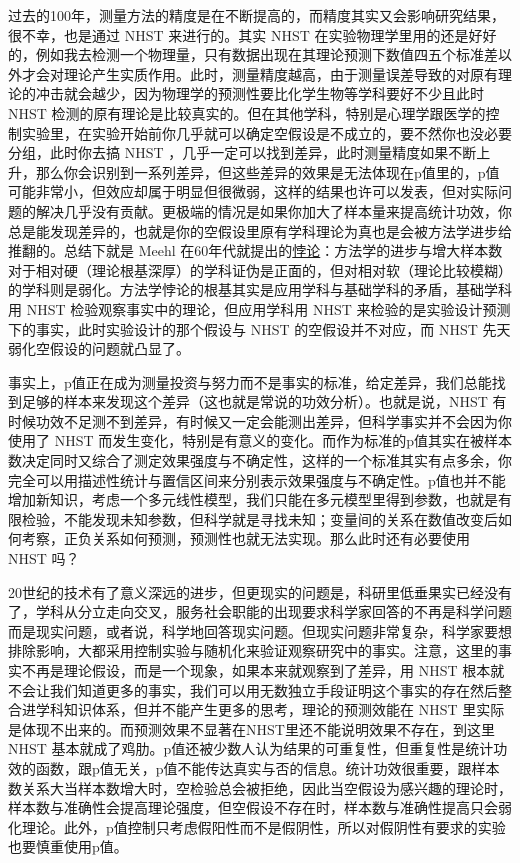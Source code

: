 \documentclass[]{tufte-book}
\begin{document}
过去的100年，测量方法的精度是在不断提高的，而精度其实又会影响研究结果，很不幸，也是通过 NHST 来进行的。其实 NHST 在实验物理学里用的还是好好的，例如我去检测一个物理量，只有数据出现在其理论预测下数值四五个标准差以外才会对理论产生实质作用。此时，测量精度越高，由于测量误差导致的对原有理论的冲击就会越少，因为物理学的预测性要比化学生物等学科要好不少且此时 NHST 检测的原有理论是比较真实的。但在其他学科，特别是心理学跟医学的控制实验里，在实验开始前你几乎就可以确定空假设是不成立的，要不然你也没必要分组，此时你去搞 NHST ，几乎一定可以找到差异，此时测量精度如果不断上升，那么你会识别到一系列差异，但这些差异的效果是无法体现在p值里的，p值可能非常小，但效应却属于明显但很微弱，这样的结果也许可以发表，但对实际问题的解决几乎没有贡献。更极端的情况是如果你加大了样本量来提高统计功效，你总是能发现差异的，也就是你的空假设里原有学科理论为真也是会被方法学进步给推翻的。总结下就是 Meehl 在60年代就提出的\href{https://philpapers.org/rec/MEETIP}{悖论}：方法学的进步与增大样本数对于相对硬（理论根基深厚）的学科证伪是正面的，但对相对软（理论比较模糊）的学科则是弱化。方法学悖论的根基其实是应用学科与基础学科的矛盾，基础学科用 NHST 检验观察事实中的理论，但应用学科用 NHST 来检验的是实验设计预测下的事实，此时实验设计的那个假设与 NHST 的空假设并不对应，而 NHST 先天弱化空假设的问题就凸显了。

事实上，p值正在成为测量投资与努力而不是事实的标准，给定差异，我们总能找到足够的样本来发现这个差异（这也就是常说的功效分析）。也就是说，NHST 有时候功效不足测不到差异，有时候又一定会能测出差异，但科学事实并不会因为你使用了 NHST 而发生变化，特别是有意义的变化。而作为标准的p值其实在被样本数决定同时又综合了测定效果强度与不确定性，这样的一个标准其实有点多余，你完全可以用描述性统计与置信区间来分别表示效果强度与不确定性。p值也并不能增加新知识，考虑一个多元线性模型，我们只能在多元模型里得到参数，也就是有限检验，不能发现未知参数，但科学就是寻找未知；变量间的关系在数值改变后如何考察，正负关系如何预测，预测性也就无法实现。那么此时还有必要使用 NHST 吗？

20世纪的技术有了意义深远的进步，但更现实的问题是，科研里低垂果实已经没有了，学科从分立走向交叉，服务社会职能的出现要求科学家回答的不再是科学问题而是现实问题，或者说，科学地回答现实问题。但现实问题非常复杂，科学家要想排除影响，大都采用控制实验与随机化来验证观察研究中的事实。注意，这里的事实不再是理论假设，而是一个现象，如果本来就观察到了差异，用 NHST 根本就不会让我们知道更多的事实，我们可以用无数独立手段证明这个事实的存在然后整合进学科知识体系，但并不能产生更多的思考，理论的预测效能在 NHST 里实际是体现不出来的。而预测效果不显著在NHST里还不能说明效果不存在，到这里 NHST 基本就成了鸡肋。p值还被少数人认为结果的可重复性，但重复性是统计功效的函数，跟p值无关，p值不能传达真实与否的信息。统计功效很重要，跟样本数关系大当样本数增大时，空检验总会被拒绝，因此当空假设为感兴趣的理论时，样本数与准确性会提高理论强度，但空假设不存在时，样本数与准确性提高只会弱化理论。此外，p值控制只考虑假阳性而不是假阴性，所以对假阴性有要求的实验也要慎重使用p值。
\end{document}
